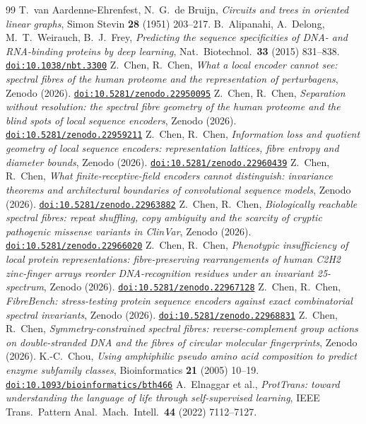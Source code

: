 \documentclass[11pt]{article}
\newcommand{\doi}[1]{\href{https://doi.org/#1}{\nolinkurl{doi:#1}}}
\theoremstyle{plain}
\theoremstyle{definition}
\theoremstyle{remark}
\begin{document}
\small
\begin{thebibliography}{99}
 T.~van Aardenne-Ehrenfest, N.~G.~de Bruijn, \emph{Circuits and trees in oriented linear
graphs}, Simon Stevin \textbf{28} (1951) 203--217.
 B.~Alipanahi, A.~Delong, M.~T.~Weirauch, B.~J.~Frey, \emph{Predicting the sequence
specificities of DNA- and RNA-binding proteins by deep learning}, Nat.\ Biotechnol.\ \textbf{33} (2015)
831--838. \doi{10.1038/nbt.3300}
 Z.~Chen, R.~Chen, \emph{What a local encoder cannot see: spectral fibres of the human proteome
and the representation of perturbagens}, Zenodo (2026). \doi{10.5281/zenodo.22950095}
 Z.~Chen, R.~Chen, \emph{Separation without resolution: the spectral fibre geometry of the human
proteome and the blind spots of local sequence encoders}, Zenodo (2026). \doi{10.5281/zenodo.22959211}
 Z.~Chen, R.~Chen, \emph{Information loss and quotient geometry of local sequence encoders:
representation lattices, fibre entropy and diameter bounds}, Zenodo (2026). \doi{10.5281/zenodo.22960439}
 Z.~Chen, R.~Chen, \emph{What finite-receptive-field encoders cannot distinguish: invariance
theorems and architectural boundaries of convolutional sequence models}, Zenodo (2026).
\doi{10.5281/zenodo.22963882}
 Z.~Chen, R.~Chen, \emph{Biologically reachable spectral fibres: repeat shuffling, copy
ambiguity and the scarcity of cryptic pathogenic missense variants in ClinVar}, Zenodo (2026).
\doi{10.5281/zenodo.22966020}
 Z.~Chen, R.~Chen, \emph{Phenotypic insufficiency of local protein representations:
fibre-preserving rearrangements of human C2H2 zinc-finger arrays reorder DNA-recognition residues under an
invariant 25-spectrum}, Zenodo (2026). \doi{10.5281/zenodo.22967128}
 Z.~Chen, R.~Chen, \emph{FibreBench: stress-testing protein sequence encoders against exact
combinatorial spectral invariants}, Zenodo (2026). \doi{10.5281/zenodo.22968831}
 Z.~Chen, R.~Chen, \emph{Symmetry-constrained spectral fibres: reverse-complement group actions
on double-stranded DNA and the fibres of circular molecular fingerprints}, Zenodo (2026).
 K.-C.~Chou, \emph{Using amphiphilic pseudo amino acid composition to predict enzyme subfamily
classes}, Bioinformatics \textbf{21} (2005) 10--19. \doi{10.1093/bioinformatics/bth466}
 A.~Elnaggar et al., \emph{ProtTrans: toward understanding the language of life through
self-supervised learning}, IEEE Trans.\ Pattern Anal.\ Mach.\ Intell.\ \textbf{44} (2022) 7112--7127.

\end{thebibliography}
\end{document}
